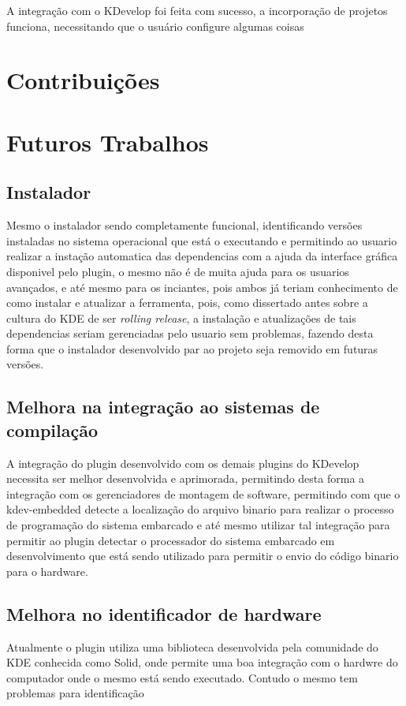 A integração com o KDevelop foi feita com sucesso, a incorporação de projetos funciona, necessitando que o usuário configure algumas
coisas

\section{Contribuições}

\section{Futuros Trabalhos}


\subsection{Instalador}
Mesmo o instalador sendo completamente funcional, identificando versões instaladas no sistema operacional que está o executando e
permitindo ao usuario realizar a instação automatica das dependencias com a ajuda da interface gráfica disponivel pelo plugin,
o mesmo não é de muita ajuda para os usuarios avançados, e até mesmo para os inciantes, pois ambos já teriam conhecimento de como
instalar e atualizar a ferramenta, pois, como dissertado antes sobre a cultura do KDE de ser \textit{rolling release}, a
instalação e atualizações de tais dependencias seriam gerenciadas pelo usuario sem problemas, fazendo desta forma que o instalador
desenvolvido par ao projeto seja removido em futuras versões.

\subsection{Melhora na integração ao sistemas de compilação}
A integração do plugin desenvolvido com os demais plugins do KDevelop necessita ser melhor desenvolvida e aprimorada, permitindo desta
forma a integração com os gerenciadores de montagem de software, permitindo com que o kdev-embedded detecte a localização do arquivo
binario para realizar o processo de programação do sistema embarcado e até mesmo utilizar tal integração para permitir ao plugin
detectar o processador do sistema embarcado em desenvolvimento que está sendo utilizado para permitir o envio do código binario para
o hardware.

\subsection{Melhora no identificador de hardware}
Atualmente o plugin utiliza uma biblioteca desenvolvida pela comunidade do KDE conhecida como Solid, onde permite uma boa integração
com o hardwre do computador onde o mesmo está sendo executado. Contudo o mesmo tem problemas para identificação

